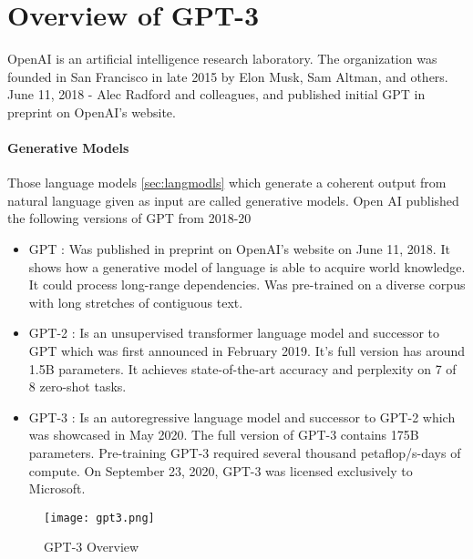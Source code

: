 \chapter*{Overview of GPT-3}
\label{chap:overview}
\thispagestyle{fancy}

OpenAI is an artificial intelligence research laboratory. The organization was founded in San Francisco in late 2015 by Elon Musk, Sam Altman, and others. June 11, 2018 - Alec Radford and colleagues, and published initial GPT in preprint on OpenAI's website. 

\subsubsection*{Generative Models}
\label{subsub:genmodls}

\hspace{0.5cm} Those language models \ref{sec:langmodls} which generate a coherent output from natural language given as input are called generative models. Open AI published the following versions of GPT from 2018-20

\begin{itemize}
    \item GPT : Was published in preprint on OpenAI's website on June 11, 2018. It shows how a generative model of language is able to acquire world knowledge. It could process long-range dependencies. Was pre-trained on a diverse corpus with long stretches of contiguous text.
    \item GPT-2 : Is an unsupervised transformer language model and successor to GPT which was first announced in February 2019. It's full version has around 1.5B parameters. It achieves state-of-the-art accuracy and perplexity on 7 of 8 zero-shot tasks.
    \item GPT-3 : Is an autoregressive language model and successor to GPT-2 which was showcased in May 2020. The full version of GPT-3 contains 175B parameters. Pre-training GPT-3 required several thousand petaflop/s-days of compute. On September 23, 2020, GPT-3 was licensed exclusively to Microsoft.
\end{itemize}

\begin{figure}[!htbp]
    \centering
    \texttt{[image: gpt3.png]}
    \caption[GPT-3 Overview]{GPT-3 Overview}
    \label{fig:gpt3ovrviw}
\end{figure}

\vspace*{\fill}